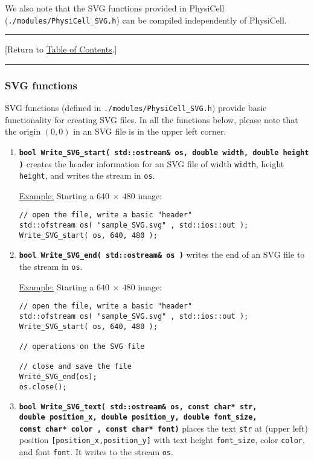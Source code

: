 \documentclass[12pt]{article}
\renewcommand{\v}{\verb}
\newcommand{\smallcode}[1]{\textbf{\texttt{#1}}}
\newcommand{\blue}[1]{\textcolor{blue}{#1}}
\newcommand{\DONE}{}%
\newcommand{\TOClink}{\begin{center}\hrule\vskip-10pt\phantom{.}\hfill[Return to \hyperlink{TOC}{Table of Contents}.]\hfill\phantom{.}\vskip3pt\hrule\end{center}}
\begin{document}
We also note that the SVG functions provided in PhysiCell 
(\v|./modules/PhysiCell_SVG.h|) can be compiled independently 
of PhysiCell. 

\TOClink

\subsubsection{SVG functions \DONE}
\label{sec:SVG_functions}
SVG functions (defined in \v|./modules/PhysiCell_SVG.h|) provide basic 
functionality for creating SVG files. In all the functions below, 
please note that the origin $(0,0)$ in an SVG file is in the upper 
left corner. 

\begin{enumerate}
\item 
\smallcode{bool Write\_SVG\_start( std::ostream\& os, double width, double height )} 
creates the header information for an SVG file of width \v|width|, 
height \v|height|, and writes the stream in \v|os|. 

\underline{Example:} Starting a $640 \: \times \: 480$ image: %
\begin{verbatim}
// open the file, write a basic "header"
std::ofstream os( "sample_SVG.svg" , std::ios::out );
Write_SVG_start( os, 640, 480 ); 
\end{verbatim}

\item 
\smallcode{bool Write\_SVG\_end( std::ostream\& os )} 
writes the end of an SVG file to the stream in \v|os|. 

\underline{Example:} Starting a $640 \: \times \: 480$ image:%
\begin{verbatim}
// open the file, write a basic "header"
std::ofstream os( "sample_SVG.svg" , std::ios::out );
Write_SVG_start( os, 640, 480 ); 

// operations on the SVG file

// close and save the file 
Write_SVG_end(os); 
os.close(); 
\end{verbatim}

\item 
\smallcode{bool Write\_SVG\_text( std::ostream\& os, const char* str,\\
\phantom{bool }double position\_x, double position\_y, double font\_size, \\
\phantom{bool }const char* color , const char* font)} places the text 
\v|str| at (upper left) position 
\v|[position_x,position_y]| with text height \v|font_size|, color \v|color|, 
and font \v|font|. It writes to the stream \v|os|. 


\end{enumerate}
\end{document}
